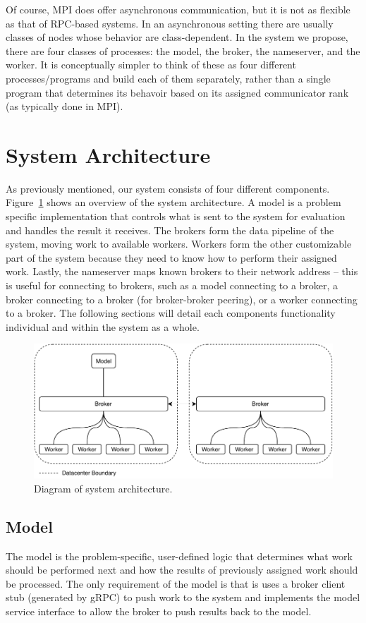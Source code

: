 \documentclass[conference]{IEEEtran}
\begin{document}
Of course,
MPI does offer asynchronous communication, but it is not as flexible as that of
RPC-based systems. In an asynchronous setting there are usually classes of nodes
whose behavior are class-dependent. In the system we propose, there are four
classes of processes: the model, the broker, the nameserver, and the worker. It
is conceptually simpler to think of these as four different processes/programs
and build each of them separately, rather than a single program that determines
its behavoir based on its assigned communicator rank (as typically done in MPI).


\section{System Architecture}
As previously mentioned, our system consists of four different components.
Figure~\ref{fig:sys-arch} shows an overview of the system architecture.  A model
is a problem specific implementation that controls what is sent to the system
for evaluation and handles the result it receives. The brokers form the data
pipeline of the system, moving work to available workers. Workers form the other
customizable part of the system because they need to know how to perform their
assigned work.  Lastly, the nameserver maps known brokers to their network
address -- this is useful for connecting to brokers, such as a model connecting
to a broker, a broker connecting to a broker (for broker-broker peering), or a
worker connecting to a broker. The following sections will detail each
components functionality individual and within the system as a whole.

\begin{figure}
  \centering
  \includegraphics{img/broker-arch.pdf}
  \caption{Diagram of system architecture.}
  \label{fig:sys-arch}
\end{figure}

\subsection{Model}
The model is the problem-specific, user-defined logic that determines what work
should be performed next and how the results of previously assigned work should
be processed. The only requirement of the model is that is uses a broker client
stub (generated by gRPC) to push work to the system and implements the model
service interface to allow the broker to push results back to the model.
\end{document}
